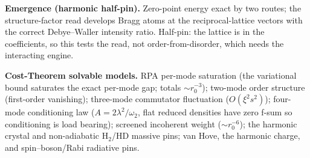 \documentclass[11pt]{article}
\theoremstyle{definition}
\theoremstyle{remark}
\begin{document}
\textbf{Emergence (harmonic half-pin).}  Zero-point energy exact by two
routes; the structure-factor read develops Bragg atoms at the
reciprocal-lattice vectors with the correct Debye--Waller intensity ratio.
Half-pin: the lattice is in the coefficients, so this tests the read, not
order-from-disorder, which needs the interacting engine.

\textbf{Cost-Theorem solvable models.}  RPA per-mode saturation (the
variational bound saturates the exact per-mode gap; totals
$\sim r_0^{-3}$); two-mode order structure (first-order vanishing);
three-mode commutator fluctuation ($O(\xi^2 s^2)$); four-mode conditioning
law ($A=2\lambda^2/\omega_2$, flat reduced densities have zero f-sum so
conditioning is load bearing); screened incoherent weight
($\sim r_0^{-6}$); the harmonic crystal and non-adiabatic H$_2$/HD massive
pins; van Hove, the harmonic charge, and spin--boson/Rabi radiative pins.
\end{document}
